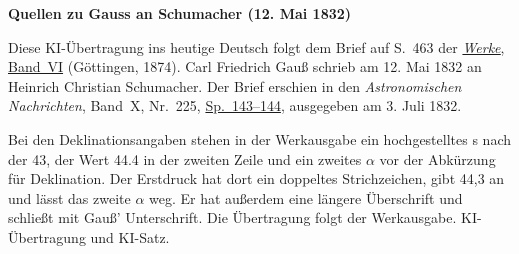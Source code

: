 \clearpage\thispagestyle{empty}
\begin{center}\textbf{Quellen zu Gauss an Schumacher (12. Mai 1832)}\end{center}
\noindent Diese KI-Übertragung ins heutige Deutsch folgt dem Brief auf S.~463 der \href{https://gdz.sub.uni-goettingen.de/id/PPN236007467}{\textit{Werke}, Band~VI} (Göttingen, 1874). Carl Friedrich Gauß schrieb am 12. Mai 1832 an Heinrich Christian Schumacher. Der Brief erschien in den \textit{Astronomischen Nachrichten}, Band~X, Nr.~225, \href{https://api.digitale-sammlungen.de/iiif/image/v2/bsb10049435_00080/full/1800,/0/default.jpg}{Sp.~143--144}, ausgegeben am 3. Juli 1832.
\par\smallskip\noindent Bei den Deklinationsangaben stehen in der Werkausgabe ein hochgestelltes \textup{s} nach der 43, der Wert 44.4 in der zweiten Zeile und ein zweites $\alpha$ vor der Abkürzung für Deklination. Der Erstdruck hat dort ein doppeltes Strichzeichen, gibt 44,3 an und lässt das zweite $\alpha$ weg. Er hat außerdem eine längere Überschrift und schließt mit Gauß’ Unterschrift. Die Übertragung folgt der Werkausgabe. KI-Übertragung und KI-Satz.
\clearpage
